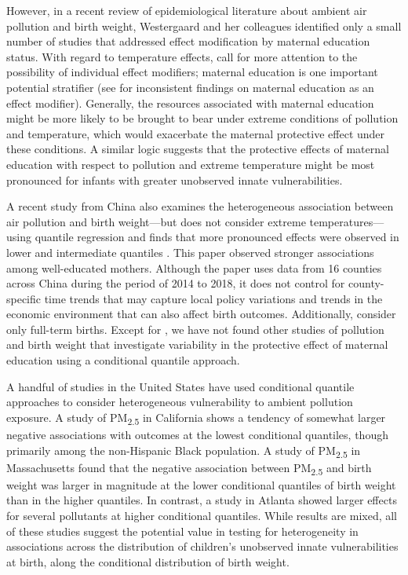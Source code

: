 However, in a recent review of epidemiological literature about ambient air
pollution and birth weight, Westergaard and her colleagues \parencite*{westergaard_ambient_2017}
identified only a small number of studies that addressed effect
modification by maternal education status. With regard to
temperature effects, \textcite{zhang_temperature_2017} call for more attention to the possibility of individual effect modifiers; maternal education is one important potential stratifier
(see \textcite{basu_temperature_2018, son_impacts_2019} for inconsistent findings on
maternal education as an effect modifier). Generally, the resources
associated with maternal education might be more likely to be brought to
bear under extreme conditions of pollution and temperature, which would
exacerbate the maternal protective effect under these conditions. A
similar logic suggests that the protective effects of maternal education
with respect to pollution and extreme temperature might be most
pronounced for infants with greater unobserved innate vulnerabilities.  

A recent study from China also examines the heterogeneous association between air pollution and birth weight---but does not consider extreme temperatures---using quantile regression and finds that more pronounced effects were observed in lower and intermediate quantiles \autocite{wu_effects_2021}. This paper observed stronger associations among well-educated mothers. Although the paper uses data from 16 counties across China during the period of 2014 to 2018, it does not control for county-specific time trends that may capture local policy variations and trends in the economic environment that can also affect birth outcomes. Additionally, \textcite{wu_effects_2021} consider only full-term births. Except for \textcite{wu_effects_2021}, we have not found other studies of pollution and birth weight that investigate variability in the protective effect of maternal education using a conditional quantile approach. 

A handful of studies in the United States have used conditional quantile approaches to consider heterogeneous vulnerability to ambient pollution exposure. A study of PM\textsubscript{2.5} in California \autocite{schwarz_quantile_2019} shows a tendency of somewhat larger negative associations with outcomes at the lowest conditional quantiles, though primarily among the non-Hispanic Black population.  A study of PM\textsubscript{2.5} in Massachusetts \autocite{fong_fine_2019} found that the negative association between
PM\textsubscript{2.5} and birth weight was larger in magnitude at the
lower conditional quantiles of birth weight than in the
higher quantiles. In contrast, a study in Atlanta \autocite{strickland_associations_2019} showed larger effects for several pollutants at higher conditional quantiles.  While results are mixed, all of these studies suggest the potential value in testing for heterogeneity in associations across the distribution of children's unobserved innate vulnerabilities at birth, along the conditional distribution of birth weight. 

